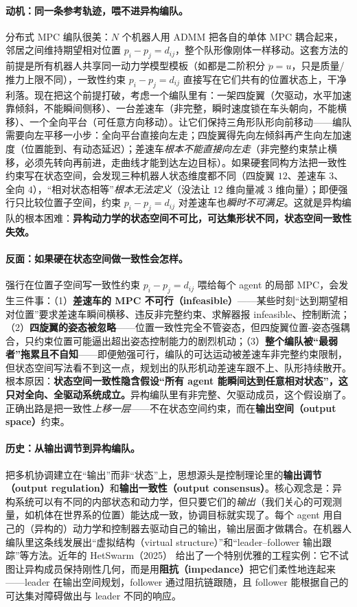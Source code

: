 \paragraph{动机：同一条参考轨迹，喂不进异构编队。}
分布式 MPC 编队很美：$N$ 个机器人用 ADMM 把各自的单体 MPC 耦合起来，邻居之间维持期望相对位置 $p_i-p_j=d_{ij}$，整个队形像刚体一样移动。这套方法的前提是所有机器人共享同一动力学模型模板（如都是二阶积分 $\ddot p=u$，只是质量/推力上限不同），一致性约束 $p_i-p_j=d_{ij}$ 直接写在它们共有的位置状态上，干净利落。现在把这个前提打破，考虑一个编队里有：一架四旋翼（欠驱动，水平加速靠倾斜，不能瞬间侧移）、一台差速车（非完整，瞬时速度锁在车头朝向，不能横移）、一个全向平台（可任意方向移动）。让它们保持三角形队形向前移动——编队需要向左平移一小步：全向平台直接向左走；四旋翼得先向左倾斜再产生向左加速度（位置能到、有动态延迟）；差速车\emph{根本不能直接向左走}（非完整约束禁止横移，必须先转向再前进，走曲线才能到达左边目标）。如果硬套同构方法把一致性约束写在状态空间，会发现三种机器人状态维度都不同（四旋翼 $12$、差速车 $3$、全向 $4$），“相对状态相等”\emph{根本无法定义}（没法让 $12$ 维向量减 $3$ 维向量）；即便强行只比较位置子空间，约束 $p_i-p_j=d_{ij}$ 对差速车也\emph{瞬时不可满足}。这就是异构编队的根本困难：\textbf{异构动力学的状态空间不可比，可达集形状不同，状态空间一致性失效。}

\paragraph{反面：如果硬在状态空间做一致性会怎样。}
强行在位置子空间写一致性约束 $p_i-p_j=d_{ij}$ 喂给每个 agent 的局部 MPC，会发生三件事：（1）\textbf{差速车的 MPC 不可行（infeasible）}——某些时刻“达到期望相对位置”要求差速车瞬间横移、违反非完整约束、求解器报 infeasible、控制断流；（2）\textbf{四旋翼的姿态被忽略}——位置一致性完全不管姿态，但四旋翼位置-姿态强耦合，只约束位置可能逼出超出姿态控制能力的剧烈机动；（3）\textbf{整个编队被“最弱者”拖累且不自知}——即便勉强可行，编队的可达运动被差速车非完整约束限制，但状态空间写法看不到这一点，规划出的队形机动差速车跟不上、队形持续散开。根本原因：\textbf{状态空间一致性隐含假设“所有 agent 能瞬间达到任意相对状态”，这只对全向、全驱动系统成立。}异构编队里有非完整、欠驱动成员，这个假设崩了。正确出路是把一致性\emph{上移一层}——不在状态空间约束，而在\textbf{输出空间（output space）}约束。

\paragraph{历史：从输出调节到异构编队。}
把多机协调建立在“输出”而非“状态”上，思想源头是控制理论里的\textbf{输出调节（output regulation）}和\textbf{输出一致性（output consensus）}。核心观念是：异构系统可以有不同的内部状态和动力学，但只要它们的\emph{输出}（我们关心的可观测量，如机体在世界系的位置）能达成一致，协调目标就实现了。每个 agent 用自己的（异构的）动力学和控制器去驱动自己的输出，输出层面才做耦合。在机器人编队里这条线发展出“虚拟结构（virtual structure）”和“leader--follower 输出跟踪”等方法。近年的 HetSwarm（2025）\cite{hetswarm2025} 给出了一个特别优雅的工程实例：它不试图让异构成员保持刚性几何，而是用\textbf{阻抗（impedance）}把它们柔性地连起来——leader 在输出空间规划，follower 通过阻抗链跟随，且 follower 能根据自己的可达集对障碍做出与 leader 不同的响应。

